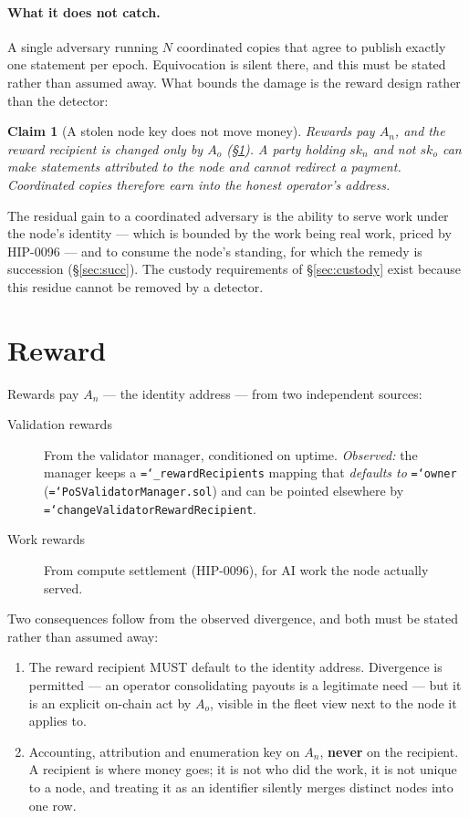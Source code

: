 \documentclass[11pt,a4paper]{article}
\newtheorem{claim}[definition]{Claim}
\newcommand{\code}[1]{\texttt{\hyphenchar\font=`\-\relax #1}}
\begin{document}
\paragraph{What it does not catch.} A single adversary running $N$ coordinated
copies that agree to publish exactly one statement per epoch. Equivocation is
silent there, and this must be stated rather than assumed away. What bounds the
damage is the reward design rather than the detector:

\begin{claim}[A stolen node key does not move money]\label{cl:nomoney}
Rewards pay $A_n$, and the reward recipient is changed only by $A_o$
(\S\ref{sec:reward}). A party holding $sk_n$ and not $sk_o$ can make statements
attributed to the node and cannot redirect a payment. Coordinated copies therefore
earn into the honest operator's address.
\end{claim}

\noindent The residual gain to a coordinated adversary is the ability to serve
work under the node's identity --- which is bounded by the work being real work,
priced by HIP-0096 --- and to consume the node's standing, for which the remedy is
succession (\S\ref{sec:succ}). The custody requirements of \S\ref{sec:custody}
exist because this residue cannot be removed by a detector.

\section{Reward}
\label{sec:reward}

Rewards pay $A_n$ --- the identity address --- from two independent sources:

\begin{description}
\item[Validation rewards] From the validator manager, conditioned on uptime.
  \emph{Observed:} the manager keeps a \code{\_rewardRecipients} mapping that
  \emph{defaults to} \code{owner} (\code{PoSValidatorManager.sol}) and can be
  pointed elsewhere by \code{changeValidatorRewardRecipient}.
\item[Work rewards] From compute settlement (HIP-0096), for AI work the node
  actually served.
\end{description}

Two consequences follow from the observed divergence, and both must be stated
rather than assumed away:

\begin{enumerate}[label=\textbf{R\arabic*.},leftmargin=2.6em]
\item The reward recipient MUST default to the identity address. Divergence is
  permitted --- an operator consolidating payouts is a legitimate need --- but it
  is an explicit on-chain act by $A_o$, visible in the fleet view next to the node
  it applies to.
\item Accounting, attribution and enumeration key on $A_n$, \textbf{never} on the
  recipient. A recipient is where money goes; it is not who did the work, it is
  not unique to a node, and treating it as an identifier silently merges distinct
  nodes into one row.
\end{enumerate}
\end{document}
